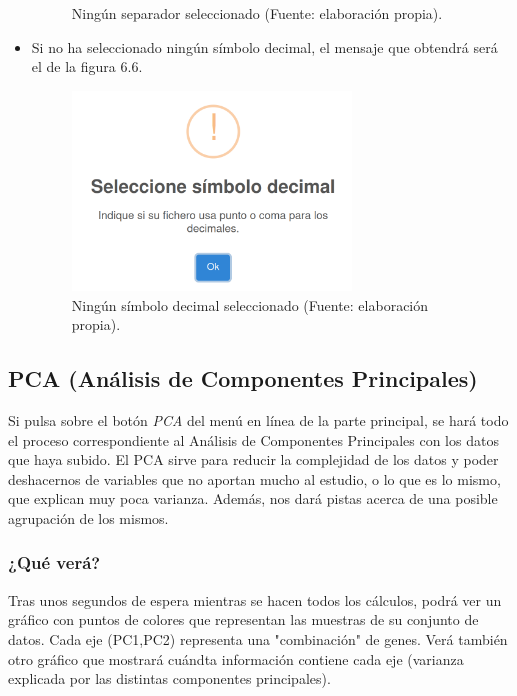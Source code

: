 \begin{itemize}
\begin{figure}[H]
        \caption{Ningún separador seleccionado (Fuente: elaboración propia).}
    \end{figure}
    \item Si no ha seleccionado ningún símbolo decimal, el mensaje que obtendrá será el de la figura 6.6.
    \begin{figure}[H]
        \centering
        \includegraphics[width=0.7\textwidth]{../img/err3.png}
        \caption{Ningún símbolo decimal seleccionado (Fuente: elaboración propia).}
    \end{figure}
\end{itemize}

\subsection{PCA (Análisis de Componentes Principales)}

Si pulsa sobre el botón \textit{PCA} del menú en línea de la parte principal, se hará todo el proceso correspondiente
al Análisis de Componentes Principales con los datos que haya subido. El PCA sirve para reducir la complejidad de los datos
y poder deshacernos de variables que no aportan mucho al estudio, o lo que es lo mismo, que explican muy poca varianza. Además, 
nos dará pistas acerca de una posible agrupación de los mismos.

\subsubsection{¿Qué verá?}

Tras unos segundos de espera mientras se hacen todos los cálculos, podrá ver un gráfico con puntos de colores que representan las muestras
de su conjunto de datos. Cada eje (PC1,PC2) representa una "combinación" de genes. Verá también otro gráfico que mostrará cuándta información
contiene cada eje (varianza explicada por las distintas componentes principales).

